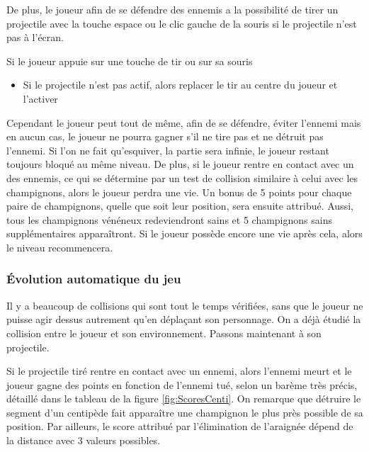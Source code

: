 De plus, le joueur afin de se défendre des ennemis a la possibilité de tirer un projectile avec la touche espace ou le clic gauche de la souris si le projectile n'est pas à l'écran.
\begin{algoinfo}
	\item Si le joueur appuie sur une touche de tir ou sur sa souris
	\begin{itemize}
		\item Si le projectile n'est pas actif, alors replacer le tir au centre du joueur et l'activer
	\end{itemize}
\end{algoinfo}


Cependant le joueur peut tout de même, afin de se défendre, éviter l'ennemi mais en aucun cas, le joueur ne pourra gagner s'il ne tire pas et ne détruit pas l'ennemi. Si l'on ne fait qu'esquiver, la partie sera infinie, le joueur restant toujours bloqué au même niveau. De plus, si le joueur rentre en contact avec un des ennemis, ce qui se détermine par un test de collision similaire à celui avec les champignons, alors le joueur perdra une vie. Un bonus de 5 points pour chaque paire de champignons, quelle que soit leur position, sera ensuite attribué. Aussi, tous les champignons vénéneux redeviendront sains et 5 champignons sains supplémentaires apparaîtront. Si le joueur possède encore une vie après cela, alors le niveau recommencera. 

\subsubsection{Évolution automatique du jeu}

Il y a beaucoup de collisions qui sont tout le temps vérifiées, sans que le joueur ne puisse agir dessus autrement qu'en déplaçant son personnage. On a déjà étudié la collision entre le joueur et son environnement. Passons maintenant à son projectile.

Si le projectile tiré rentre en contact avec un ennemi, alors l'ennemi meurt et le joueur gagne des points en fonction de l'ennemi tué, selon un barème très précis, détaillé dans le tableau de la figure \ref{fig:ScoresCenti}. On remarque que détruire le segment d'un centipède fait apparaître une champignon le plus près possible de sa position. Par ailleurs, le score attribué par l'élimination de l'araignée dépend de la distance avec 3 valeurs possibles.

